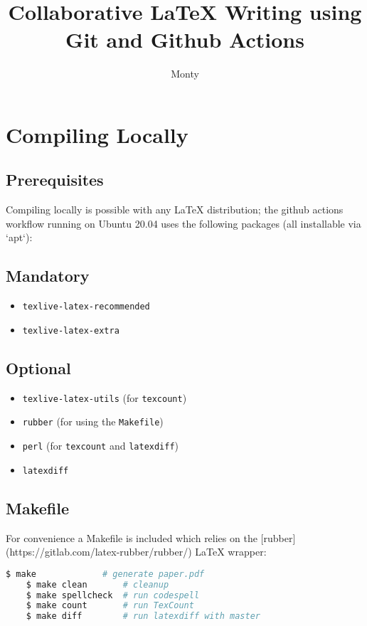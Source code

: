 \documentclass[]{article}
\title{Collaborative LaTeX Writing using Git and Github Actions}
\author{Monty}
\begin{document}
\maketitle

\section{Compiling Locally}

\subsection{Prerequisites}

Compiling locally is possible with any LaTeX distribution; the github actions workflow running on Ubuntu 20.04 uses the following packages (all installable via `apt`):

\subsection*{Mandatory}
\begin{itemize}

	\item \texttt{texlive-latex-recommended}
	\item \texttt{texlive-latex-extra}

\end{itemize}

\subsection*{Optional}
\begin{itemize}

	\item \texttt{texlive-latex-utils} \quad (for \texttt{texcount})
	\item \texttt{rubber} \quad (for using the \texttt{Makefile})
	\item \texttt{perl} \quad (for \texttt{texcount} and \texttt{latexdiff})
	\item \texttt{latexdiff}

\end{itemize}


\subsection{Makefile}

For convenience a Makefile is included which relies on the [rubber](https://gitlab.com/latex-rubber/rubber/) LaTeX wrapper:


\begin{center}
	\begin{lstlisting}[language=Bash,morekeywords={make}]
	$ make             # generate paper.pdf
	$ make clean       # cleanup
	$ make spellcheck  # run codespell
	$ make count       # run TexCount
	$ make diff        # run latexdiff with master
	\end{lstlisting}
\end{center}
\end{document}
